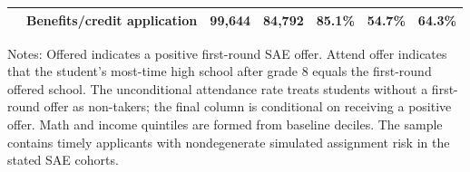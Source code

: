 \begin{table}[!htbp]
\begin{tabular}{llrrrrr}
 & Benefits/credit application & 99,644 & 84,792 & 85.1\% & 54.7\% & 64.3\% \\
\bottomrule
\end{tabular}
\par\medskip
\footnotesize
\begin{minipage}{0.98\textwidth}
Notes: Offered indicates a positive first-round SAE offer. Attend offer indicates that the student's most-time high school after grade 8 equals the first-round offered school. The unconditional attendance rate treats students without a first-round offer as non-takers; the final column is conditional on receiving a positive offer. Math and income quintiles are formed from baseline deciles. The sample contains timely applicants with nondegenerate simulated assignment risk in the stated SAE cohorts.
\end{minipage}
\end{table}

